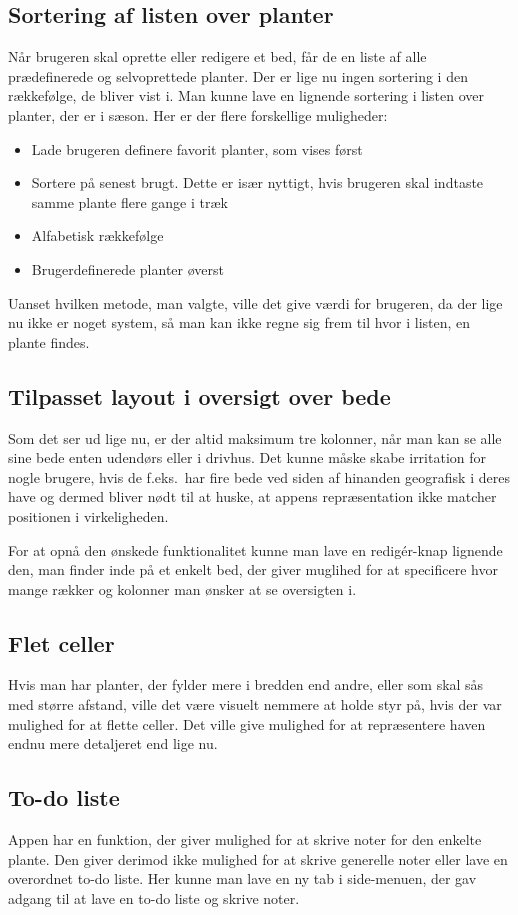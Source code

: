 \subsection{Sortering af listen over planter}
Når brugeren skal oprette eller redigere et bed, får de en liste af alle prædefinerede og selvoprettede planter. Der er lige nu ingen sortering i den rækkefølge, de bliver vist i.  Man kunne lave en lignende sortering i listen over planter, der er i sæson. Her er der flere forskellige muligheder:
\begin{itemize}
   \item Lade brugeren definere favorit planter, som vises først
   \item Sortere på senest brugt. Dette er især nyttigt, hvis brugeren skal indtaste samme plante flere gange i træk
   \item Alfabetisk rækkefølge
   \item Brugerdefinerede planter øverst
\end{itemize}

Uanset hvilken metode, man valgte, ville det give værdi for brugeren, da der lige nu ikke er noget system, så man kan ikke regne sig frem til hvor i listen, en plante findes.

\subsection{Tilpasset layout i oversigt over bede}
Som det ser ud lige nu, er der altid maksimum tre kolonner, når man kan se alle sine bede enten udendørs eller i drivhus. Det kunne måske skabe irritation for nogle brugere, hvis de f.eks.\ har fire bede ved siden af hinanden geografisk i deres have og dermed bliver nødt til at huske, at appens repræsentation ikke matcher positionen i virkeligheden. 

For at opnå den ønskede funktionalitet kunne man lave en redigér-knap lignende den, man finder inde på et enkelt bed, der giver muglihed for at specificere hvor mange rækker og kolonner man ønsker at se oversigten i.

\subsection{Flet celler}
Hvis man har planter, der fylder mere i bredden end andre, eller som skal sås med større afstand, ville det være visuelt nemmere at holde styr på, hvis der var mulighed for at flette celler. Det ville give mulighed for at repræsentere haven endnu mere detaljeret end lige nu.

\subsection{To-do liste}
Appen har en funktion, der giver mulighed for at skrive noter for den enkelte plante. Den giver derimod ikke mulighed for at skrive generelle noter eller lave en overordnet to-do liste. Her kunne man lave en ny tab i side-menuen, der gav adgang til at lave en to-do liste og skrive noter.

